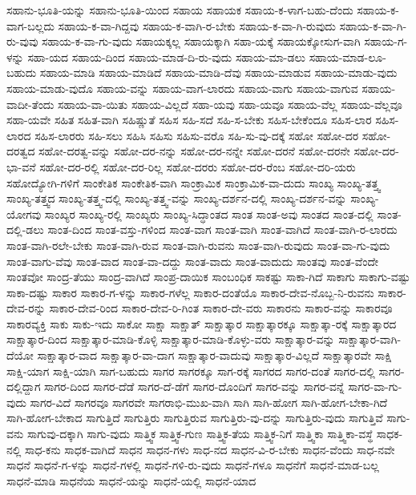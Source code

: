 {ಸಹಾನು-ಭೂತಿ-ಯನ್ನು
ಸಹಾನು-ಭೂತಿ-ಯಿಂದ
ಸಹಾಯ
ಸಹಾಯಕ
ಸಹಾಯ-ಕ-ಳಾಗ-ಬಹು-ದೆಂದು
ಸಹಾಯ-ಕ-ವಾಗ-ಬಲ್ಲದು
ಸಹಾಯ-ಕ-ವಾ-ಗಿದ್ದವು
ಸಹಾಯ-ಕ-ವಾಗಿ-ರ-ಬೇಕು
ಸಹಾಯ-ಕ-ವಾ-ಗಿ-ರುವುದು
ಸಹಾಯ-ಕ-ವಾ-ಗಿ-ರು-ವುವು
ಸಹಾಯ-ಕ-ವಾ-ಗು-ವುದು
ಸಹಾಯಕ್ಕಲ್ಲ
ಸಹಾಯಕ್ಕಾಗಿ
ಸಹಾ-ಯಕ್ಕೆ
ಸಹಾಯಕ್ಕೋಸುಗ-ವಾಗಿ
ಸಹಾಯ-ಗ-ಳನ್ನು
ಸಹಾ-ಯದ
ಸಹಾಯ-ದಿಂದ
ಸಹಾಯ-ಮಾಡ-ದಿ-ರು-ವುದು
ಸಹಾಯ-ಮಾ-ಡಲು
ಸಹಾಯ-ಮಾಡ-ಲೂ-ಬಹುದು
ಸಹಾಯ-ಮಾಡಿ
ಸಹಾಯ-ಮಾಡಿದೆ
ಸಹಾಯ-ಮಾಡಿ-ದೆವು
ಸಹಾಯ-ಮಾಡುವ
ಸಹಾಯ-ಮಾಡು-ವುದು
ಸಹಾಯ-ಮಾಡು-ವುದೊ
ಸಹಾಯ-ವನ್ನು
ಸಹಾಯ-ವಾಗ-ಲಾರದು
ಸಹಾಯ-ವಾಗು
ಸಹಾಯ-ವಾಗುವ
ಸಹಾಯ-ವಾದೀ-ತೆಂದು
ಸಹಾಯ-ವಾ-ಯಿತು
ಸಹಾಯ-ವಿಲ್ಲದೆ
ಸಹಾ-ಯವು
ಸಹಾ-ಯವೂ
ಸಹಾಯ-ವೆಲ್ಲ
ಸಹಾಯ-ವೆಲ್ಲವೂ
ಸಹಾ-ಯವೇ
ಸಹಿತ
ಸಹಿತ-ವಾಗಿ
ಸಹಿಷ್ಣುತೆ
ಸಹಿಸ
ಸಹಿ-ಸದೆ
ಸಹಿ-ಸ-ಬೇಕು
ಸಹಿಸ-ಬೇಕೆಂದೂ
ಸಹಿಸ-ಲಾರ
ಸಹಿಸ-ಲಾರದ
ಸಹಿಸ-ಲಾರರು
ಸಹಿ-ಸಲು
ಸಹಿಸಿ
ಸಹಿಸು
ಸಹಿಸು-ವರೊ
ಸಹಿ-ಸು-ವು-ದಕ್ಕೆ
ಸಹೋ
ಸಹೋ-ದರ
ಸಹೋ-ದರತ್ವದ
ಸಹೋ-ದರತ್ವ-ವನ್ನು
ಸಹೋ-ದರ-ನನ್ನು
ಸಹೋ-ದರ-ನನ್ನೇ
ಸಹೋ-ದರನೆ
ಸಹೋ-ದರನೇ
ಸಹೋ-ದರ-ಭಾ-ವನೆ
ಸಹೋ-ದರ-ರಲ್ಲಿ
ಸಹೋ-ದರ-ರಿಲ್ಲ
ಸಹೋ-ದರರು
ಸಹೋ-ದರ-ರೆಂಬ
ಸಹೋ-ದರಿ-ಯರು
ಸಹೋದ್ಯೋಗಿ-ಗಳಿಗೆ
ಸಾಂಕೇತಿಕ
ಸಾಂಕೇತಿಕ-ವಾಗಿ
ಸಾಂಕ್ರಾಮಿಕ
ಸಾಂಕ್ರಾಮಿಕ-ವಾ-ದುದು
ಸಾಂಖ್ಯ
ಸಾಂಖ್ಯ-ತತ್ತ್ವ
ಸಾಂಖ್ಯ-ತತ್ತ್ವದ
ಸಾಂಖ್ಯ-ತತ್ತ್ವ-ದಲ್ಲಿ
ಸಾಂಖ್ಯ-ತತ್ತ್ವ-ವನ್ನು
ಸಾಂಖ್ಯ-ದರ್ಶನ-ದಲ್ಲಿ
ಸಾಂಖ್ಯ-ದರ್ಶನ-ವನ್ನು
ಸಾಂಖ್ಯ-ಯೋಗವು
ಸಾಂಖ್ಯರ
ಸಾಂಖ್ಯ-ರಲ್ಲಿ
ಸಾಂಖ್ಯರು
ಸಾಂಖ್ಯ-ಸಿದ್ಧಾಂತದ
ಸಾಂತ
ಸಾಂತ-ಅವು
ಸಾಂತದ
ಸಾಂತ-ದಲ್ಲಿ
ಸಾಂತ-ದಲ್ಲಿ-ಡಲು
ಸಾಂತ-ದಿಂದ
ಸಾಂತ-ವಸ್ತು-ಗಳಿಂದ
ಸಾಂತ-ವಾಗ
ಸಾಂತ-ವಾಗಿ
ಸಾಂತ-ವಾಗಿದೆ
ಸಾಂತ-ವಾಗಿ-ರ-ಲಾರದು
ಸಾಂತ-ವಾಗಿ-ರಲೇ-ಬೇಕು
ಸಾಂತ-ವಾಗಿ-ರುವ
ಸಾಂತ-ವಾಗಿ-ರುವನು
ಸಾಂತ-ವಾಗಿ-ರುವುದು
ಸಾಂತ-ವಾ-ಗು-ವುದು
ಸಾಂತ-ವಾಗು-ವೆವು
ಸಾಂತ-ವಾದ
ಸಾಂತ-ವಾ-ದದ್ದು
ಸಾಂತ-ವಾದು
ಸಾಂತ-ವಾದುದು
ಸಾಂತವು
ಸಾಂತ-ವೆಂದೇ
ಸಾಂತವೋ
ಸಾಂದ್ರ-ತೆಯು
ಸಾಂದ್ರ-ವಾಗಿದೆ
ಸಾಂಪ್ರ-ದಾಯಿಕ
ಸಾಂಬಂಧಿಕ
ಸಾಕಷ್ಟು
ಸಾಕಾ-ಗಿದೆ
ಸಾಕಾಗು
ಸಾಕಾಗು-ವಷ್ಟು
ಸಾಕಾ-ದಷ್ಟು
ಸಾಕಾರ
ಸಾಕಾರ-ಗ-ಳನ್ನು
ಸಾಕಾರ-ಗಳೆಲ್ಲ
ಸಾಕಾರ-ದಂತೆಯೊ
ಸಾಕಾರ-ದೇವ-ನೊಬ್ಬ-ನಿ-ರುವನು
ಸಾಕಾರ-ದೇವ-ರನ್ನು
ಸಾಕಾರ-ದೇವ-ರಿಂದ
ಸಾಕಾರ-ದೇವ-ರಿ-ಗಿಂತ
ಸಾಕಾರ-ದೇ-ವರು
ಸಾಕಾರನು
ಸಾಕಾರ-ವನ್ನು
ಸಾಕಾರವೂ
ಸಾಕಾರವ್ಯಕ್ತಿ
ಸಾಕು
ಸಾಕು-ಇದು
ಸಾಕೋ
ಸಾಕ್ಷಾ
ಸಾಕ್ಷಾತ್
ಸಾಕ್ಷಾತ್ಕಾರ
ಸಾಕ್ಷಾತ್ಕಾರಕ್ಕೂ
ಸಾಕ್ಷಾತ್ಕಾ-ರಕ್ಕೆ
ಸಾಕ್ಷಾತ್ಕಾರದ
ಸಾಕ್ಷಾತ್ಕಾರ-ದಿಂದ
ಸಾಕ್ಷಾತ್ಕಾರ-ಮಾಡಿ-ಕೊಳ್ಳಿ
ಸಾಕ್ಷಾತ್ಕಾರ-ಮಾಡಿ-ಕೊಳ್ಳು-ವರು
ಸಾಕ್ಷಾತ್ಕಾರ-ವನ್ನು
ಸಾಕ್ಷಾತ್ಕಾರ-ವಾಗಿ-ದೆಯೋ
ಸಾಕ್ಷಾತ್ಕಾರ-ವಾದ
ಸಾಕ್ಷಾತ್ಕಾರ-ವಾ-ದಾಗ
ಸಾಕ್ಷಾತ್ಕಾರ-ವಾದುವು
ಸಾಕ್ಷಾತ್ಕಾರ-ವಿಲ್ಲದೆ
ಸಾಕ್ಷಾತ್ಕಾರವೇ
ಸಾಕ್ಷಿ
ಸಾಕ್ಷಿ-ಯಾಗ
ಸಾಕ್ಷಿ-ಯಾಗಿ
ಸಾಗ-ಬಹುದು
ಸಾಗರ
ಸಾಗರಕ್ಕೂ
ಸಾಗ-ರಕ್ಕೆ
ಸಾಗರದ
ಸಾಗರ-ದಂತೆ
ಸಾಗರ-ದಲ್ಲಿ
ಸಾಗರ-ದಲ್ಲಿದ್ದಾಗ
ಸಾಗರ-ದಿಂದ
ಸಾಗರ-ದೆಡೆ
ಸಾಗರ-ದೆ-ಡೆಗೆ
ಸಾಗರ-ದೊಂದಿಗೆ
ಸಾಗರ-ವನ್ನು
ಸಾಗರ-ವನ್ನೆ
ಸಾಗರ-ವಾ-ಗು-ವುದು
ಸಾಗರ-ವಿದೆ
ಸಾಗರವೂ
ಸಾಗರವೇ
ಸಾಗರಾಭಿ-ಮುಖ-ವಾಗಿ
ಸಾಗಿ
ಸಾಗಿ-ಹೋಗ
ಸಾಗಿ-ಹೋಗ-ಬೇಕಾ-ಗಿದೆ
ಸಾಗಿ-ಹೋಗ-ಬೇಕಾದ
ಸಾಗುತ್ತಿದೆ
ಸಾಗುತ್ತಿರು
ಸಾಗುತ್ತಿರುವ
ಸಾಗುತ್ತಿರು-ವು-ದನ್ನು
ಸಾಗುತ್ತಿರು-ವುದು
ಸಾಗುತ್ತಿವೆ
ಸಾಗು-ವನು
ಸಾಗುವು-ದಕ್ಕಾಗಿ
ಸಾಗು-ವುದು
ಸಾತ್ತ್ವಿಕ
ಸಾತ್ತ್ವಿಕ-ಗುಣ
ಸಾತ್ತ್ವಿಕ-ತೆಯ
ಸಾತ್ತ್ವಿಕ-ನಿಗೆ
ಸಾತ್ತ್ವಿಕಾ
ಸಾತ್ತ್ವಿಕಾ-ವಸ್ಥೆ
ಸಾಧಕ-ನಲ್ಲಿ
ಸಾಧ-ಕನು
ಸಾಧಕ-ವಾಗಿದೆ
ಸಾಧನ
ಸಾಧನ-ಗಳು
ಸಾಧ-ನದ
ಸಾಧನ-ವಿ-ರ-ಬೇಕು
ಸಾಧನ-ವೆಂದು
ಸಾಧ-ನವೇ
ಸಾಧನೆ
ಸಾಧನೆ-ಗ-ಳನ್ನು
ಸಾಧನೆ-ಗಳಲ್ಲಿ
ಸಾಧನೆ-ಗಳಿ-ರು-ವುದು
ಸಾಧನೆ-ಗಳೂ
ಸಾಧನೆಗೆ
ಸಾಧನೆ-ಮಾಡ-ಬಲ್ಲ
ಸಾಧನೆ-ಮಾಡಿ
ಸಾಧನೆಯ
ಸಾಧನೆ-ಯನ್ನು
ಸಾಧನೆ-ಯಲ್ಲಿ
ಸಾಧನೆ-ಯಾದ
}
